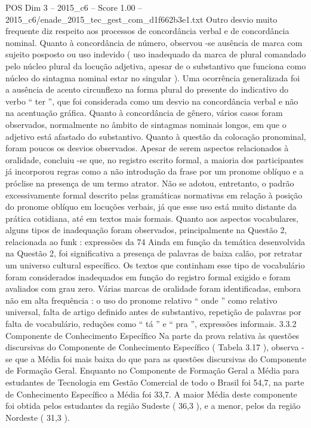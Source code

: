 \begin{textsample}{POS Dim 3 – 2015\_c6 – Score 1.00 – 2015\_c6/enade\_2015\_tec\_gest\_com\_d1f662b3e1.txt}
Outro desvio muito frequente diz respeito aos processos de concordância verbal e de concordância nominal.
Quanto à concordância de número, observou -se ausência de marca com sujeito posposto ou uso indevido ( uso inadequado da marca de plural comandado pelo núcleo plural da locução adjetiva, apesar de o substantivo que funciona como núcleo do sintagma nominal estar no singular ).
Uma ocorrência generalizada foi a ausência de acento circunflexo na forma plural do presente do indicativo do verbo “ ter ”, que foi considerada como um desvio na concordância verbal e não na acentuação gráfica.
Quanto à concordância de gênero, vários casos foram observados, normalmente no âmbito de sintagmas nominais longos, em que o adjetivo está afastado do substantivo.
Quanto à questão da colocação pronominal, foram poucos os desvios observados.
Apesar de serem aspectos relacionados à oralidade, concluiu -se que, no registro escrito formal, a maioria dos participantes já incorporou regras como a não introdução da frase por um pronome oblíquo e a próclise na presença de um termo atrator.
Não se adotou, entretanto, o padrão excessivamente formal descrito pelas gramáticas normativas em relação à posição do pronome oblíquo em locuções verbais, já que esse uso está muito distante da prática cotidiana, até em textos mais formais.
Quanto aos aspectos vocabulares, alguns tipos de inadequação foram observados, principalmente na Questão 2, relacionada ao funk : expressões da 74 Ainda em função da temática desenvolvida na Questão 2, foi significativa a presença de palavras de baixa calão, por retratar um universo cultural específico.
Os textos que continham esse tipo de vocabulário foram considerados inadequados em função do registro formal exigido e foram avaliados com grau zero.
Várias marcas de oralidade foram identificadas, embora não em alta frequência : o uso do pronome relativo “ onde ” como relativo universal, falta de artigo definido antes de substantivo, repetição de palavras por falta de vocabulário, reduções como “ tá ” e “ pra ”, expressões informais. 3.3.2 Componente de Conhecimento Específico Na parte da prova relativa às questões discursivas do Componente de Conhecimento Específico ( Tabela 3.17 ), observa -se que a Média foi mais baixa do que para as questões discursivas do Componente de Formação Geral.
Enquanto no Componente de Formação Geral a Média para estudantes de Tecnologia em Gestão Comercial de todo o Brasil foi 54,7, na parte de Conhecimento Específico a Média foi 33,7.
A maior Média deste componente foi obtida pelos estudantes da região Sudeste ( 36,3 ), e a menor, pelos da região Nordeste ( 31,3 ).

\end{textsample}
